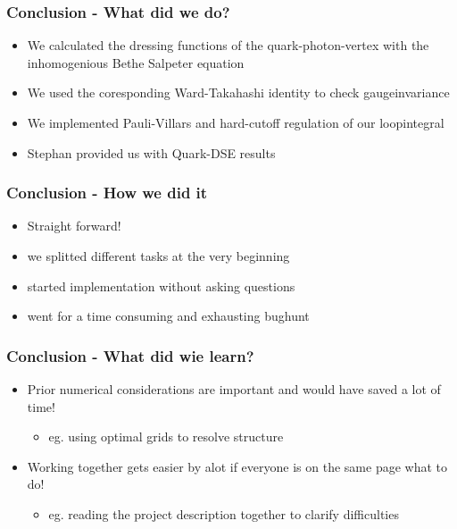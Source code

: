 \begin{frame}
	\frametitle{Conclusion - What did we do?}
			\begin{itemize}
				\item We calculated the dressing functions of the quark-photon-vertex with the inhomogenious Bethe Salpeter equation
					\vspace{2mm}
				\item We used the coresponding Ward-Takahashi identity to check gaugeinvariance
					\vspace{2mm}
				\item We implemented Pauli-Villars and hard-cutoff regulation of our loopintegral 
					\vspace{2mm}
				\item Stephan provided us with Quark-DSE results 
			\end{itemize}
\end{frame}

\begin{frame}
	\frametitle{Conclusion - How we did it} 
			\begin{itemize}
				\item Straight forward!
					\vspace{2mm}
				\item we splitted different tasks at the very beginning
					\vspace{2mm}
				\item started implementation without asking questions
					\vspace{2mm}
				\item went for a time consuming and exhausting bughunt
			\end{itemize}
\end{frame}


\begin{frame}
    \frametitle{Conclusion - What did wie learn?}
    \begin{itemize}
        \item Prior numerical considerations are important and would have saved a lot of time!
        	\begin{itemize}
        		\item eg. using optimal grids to resolve structure
        	\end{itemize}
        		\vspace{3mm}
        \item Working together gets easier by alot if everyone is on the same page what to do!
        	\begin{itemize}
        		\item eg. reading the project description together to clarify difficulties    
        	\end{itemize}
    \end{itemize}
\end{frame}